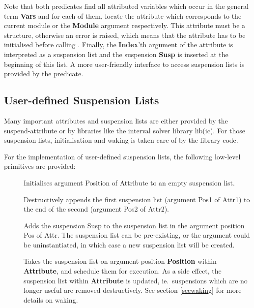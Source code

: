 Note that both predicates
find all attributed variables which occur in the general term {\bf Vars} and for each of them,
locate the attribute which corresponds to the current module or the
{\bf Module} argument respectively.
This attribute must be a structure, otherwise an error
is raised, which means that the attribute has to be initialised
before calling
.
Finally, the {\bf Index}'th argument of the attribute
is interpreted as a suspension list and the suspension
{\bf Susp} is inserted at the beginning of this list.
A more user-friendly interface to access suspension lists is
provided by the
predicate.


\subsection{User-defined Suspension Lists}

Many important attributes and suspension lists are either provided by
the suspend-attribute or by libraries like the interval solver library lib(ic).
For those suspension lists, initialisation and waking is taken care of
by the library code.

For the implementation of user-defined suspension lists,
the following low-level primitives are provided:
\begin{description}
\item[]
    Initialises argument Position of Attribute to an empty suspension list.
\item[]
    Destructively appends the first suspension list (argument Pos1 of Attr1) to
    the end of the second (argument Pos2 of Attr2).
\item[]
    Adds the suspension Susp to the suspension list in the
    argument position Pos of Attr. The suspension list can be pre-existing,
    or the argument could be uninstantiated, in which case a new suspension
    list will be created.
\item[]
    Takes the suspension list on argument position {\bf Position} within
    {\bf Attribute}, and schedule them for execution. 
    As a side effect, the suspension list within {\bf Attribute} is updated,
    ie.\ suspensions which are no longer useful are removed destructively.
    See section \ref{secwaking} for more details on waking.
\end{description}


